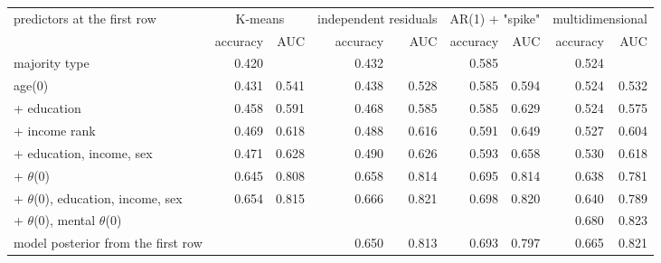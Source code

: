 \begin{tabular}{lrrrrrrrr}
\toprule
predictors at the first row & \multicolumn{2}{c}{K-means} & \multicolumn{2}{c}{independent residuals} & \multicolumn{2}{c}{AR(1) + "spike"} & \multicolumn{2}{c}{multidimensional} \\
\cmidrule(lr){2-3} \cmidrule(lr){4-5} \cmidrule(lr){6-7} \cmidrule(lr){8-9}
 & accuracy & AUC & accuracy & AUC & accuracy & AUC & accuracy & AUC \\
\midrule
majority type & 0.420 &  & 0.432 &  & 0.585 &  & 0.524 &  \\
age(0) & 0.431 & 0.541 & 0.438 & 0.528 & 0.585 & 0.594 & 0.524 & 0.532 \\
+ education & 0.458 & 0.591 & 0.468 & 0.585 & 0.585 & 0.629 & 0.524 & 0.575 \\
+ income rank & 0.469 & 0.618 & 0.488 & 0.616 & 0.591 & 0.649 & 0.527 & 0.604 \\
+ education, income, sex & 0.471 & 0.628 & 0.490 & 0.626 & 0.593 & 0.658 & 0.530 & 0.618 \\
+ $\theta$(0) & 0.645 & 0.808 & 0.658 & 0.814 & 0.695 & 0.814 & 0.638 & 0.781 \\
+ $\theta$(0), education, income, sex & 0.654 & 0.815 & 0.666 & 0.821 & 0.698 & 0.820 & 0.640 & 0.789 \\
+ $\theta$(0), mental $\theta$(0) &  &  &  &  &  &  & 0.680 & 0.823 \\
model posterior from the first row &  &  & 0.650 & 0.813 & 0.693 & 0.797 & 0.665 & 0.821 \\
\bottomrule
\end{tabular}

